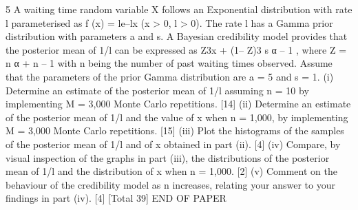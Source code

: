 \documentclass[a4paper,12pt]{article}
\begin{document}
\large 
\noindent

5 A waiting time random variable X follows an Exponential distribution with rate l
parameterised as f (x) = le–lx (x > 0, l > 0).
The rate l has a Gamma prior distribution with parameters a and s. A Bayesian
credibility model provides that the posterior mean of 1/l can be expressed as
Z3x + (1– Z)3
s
α – 1
, where Z = n
α + n – 1
with n being the number of past waiting times observed.
Assume that the parameters of the prior Gamma distribution are a = 5 and s = 1.
(i) Determine an estimate of the posterior mean of 1/l assuming n = 10 by
implementing M = 3,000 Monte Carlo repetitions. [14]
(ii) Determine an estimate of the posterior mean of 1/l and the value of x when
n = 1,000, by implementing M = 3,000 Monte Carlo repetitions. [15]
(iii) Plot the histograms of the samples of the posterior mean of 1/l and of x
obtained in part (ii). [4]
(iv) Compare, by visual inspection of the graphs in part (iii), the distributions
of the posterior mean of 1/l and the distribution of x when n = 1,000. [2]
(v) Comment on the behaviour of the credibility model as n increases, relating
your answer to your findings in part (iv). [4]
[Total 39]
END OF PAPER
\end{document}
